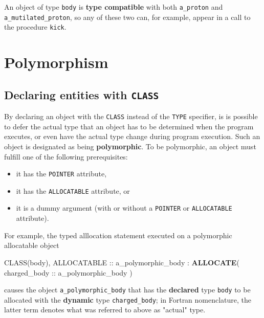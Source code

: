 \documentclass[
]{scrartcl}
\newenvironment{Shaded}{}{}
\newcommand{\DataTypeTok}[1]{\textcolor[rgb]{0.56,0.13,0.00}{#1}}
\newcommand{\KeywordTok}[1]{\textcolor[rgb]{0.00,0.44,0.13}{\textbf{#1}}}
\newcommand{\NormalTok}[1]{#1}
\providecommand{\tightlist}{%
  \setlength{\itemsep}{0pt}\setlength{\parskip}{0pt}}
\begin{document}
An object of type \texttt{body} is \textbf{type compatible} with both
\texttt{a\_proton} and \texttt{a\_mutilated\_proton}, so any of these
two can, for example, appear in a call to the procedure \texttt{kick}.

\section{Polymorphism}\label{polymorphism}

\subsection{\texorpdfstring{Declaring entities with
\texttt{CLASS}}{Declaring entities with CLASS}}\label{declaring-entities-with-class}

By declaring an object with the \texttt{CLASS} instead of the
\texttt{TYPE} specifier, is is possible to defer the actual type that an
object has to be determined when the program executes, or even have the
actual type change during program execution. Such an object is
designated as being \textbf{polymorphic}. To be polymorphic, an object
must fulfill one of the following prerequisites:

\begin{itemize}
\tightlist
\item
  it has the \texttt{POINTER} attribute,
\item
  it has the \texttt{ALLOCATABLE} attribute, or
\item
  it is a dummy argument (with or without a \texttt{POINTER} or
  \texttt{ALLOCATABLE} attribute).
\end{itemize}

For example, the typed alllocation statement executed on a polymorphic
allocatable object

\begin{Shaded}
\begin{Highlighting}[]
\DataTypeTok{CLASS(body)}\NormalTok{, }\DataTypeTok{ALLOCATABLE} \DataTypeTok{::}\NormalTok{ a\_polymorphic\_body}
\NormalTok{:}
\KeywordTok{ALLOCATE}\NormalTok{( charged\_body }\DataTypeTok{::}\NormalTok{ a\_polymorphic\_body )}
\end{Highlighting}
\end{Shaded}

causes the object \texttt{a\_polymorphic\_body} that has the
\textbf{declared} type \texttt{body} to be allocated with the
\textbf{dynamic} type \texttt{charged\_body}; in Fortran nomenclature,
the latter term denotes what was referred to above as "actual" type.
\end{document}
